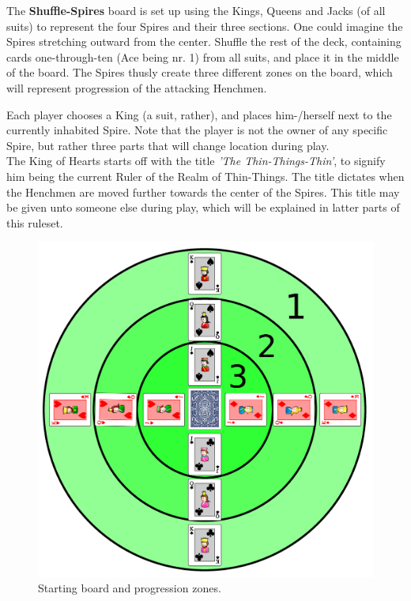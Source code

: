 \documentclass[11pt,twocolumn]{article}
\begin{document}
\noindent
The \textbf{Shuffle-Spires} board is set up using the Kings, Queens and Jacks (of all suits) to represent the four Spires and their three sections.
One could imagine the Spires stretching outward from the center.
Shuffle the rest of the deck, containing cards one-through-ten (Ace being nr. 1) from all suits, and place it in the middle of the board.
The Spires thusly create three different zones on the board, which will represent progression of the attacking Henchmen.

Each player chooses a King (a suit, rather), and places him-/herself next to the currently inhabited Spire.
Note that the player is not the owner of any specific Spire, but rather three parts that will change location during play.\\

\noindent
The King of Hearts starts off with the title \textit{'The Thin-Things-Thin'}, to signify him being the current Ruler of the Realm of Thin-Things.
The title dictates when the Henchmen are moved further towards the center of the Spires.
This title may be given unto someone else during play, which will be explained in latter parts of this ruleset.

\begin{figure}[h!]
\centering
\includegraphics[width=\linewidth]{img/starting.png}
\caption{Starting board and progression zones.}
\label{fig:starting}
\end{figure}
\end{document}
